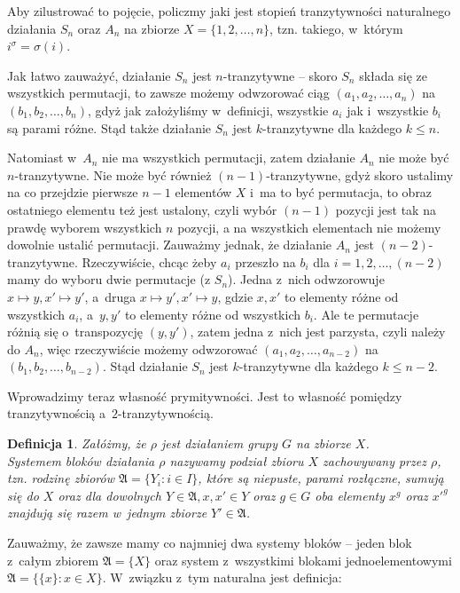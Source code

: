 \documentclass[licencjacka]{pracamgr}
\newtheorem{deff}{Definicja}[section]
\begin{document}
Aby zilustrować to pojęcie, policzmy jaki jest stopień tranzytywności naturalnego działania
$S_n$ oraz $A_n$ na zbiorze $X = \{1, 2, \ldots,
n\}$, tzn. takiego, w~którym $i^\sigma = \sigma(i)$.

Jak łatwo zauważyć, działanie $S_n$ jest $n$-tranzytywne -- skoro
$S_n$ składa się ze wszystkich permutacji, to zawsze możemy
odwzorować ciąg $(a_1, a_2, \ldots, a_n)$ na $(b_1, b_2, \ldots,
b_n)$, gdyż jak założyliśmy w~definicji, wszystkie $a_i$ jak
i~wszystkie $b_i$ są parami różne. Stąd także działanie $S_n$ jest
$k$-tranzytywne dla każdego $k \le n$.

Natomiast w~$A_n$ nie ma wszystkich permutacji, zatem działanie
$A_n$ nie może być $n$-tranzytywne. Nie może być również
$(n-1)$-tranzytywne, gdyż skoro ustalimy na co przejdzie pierwsze $n-1$
elementów $X$ i~ma to być permutacja, to obraz ostatniego elementu
też jest ustalony, czyli wybór $(n-1)$ pozycji jest tak na prawdę
wyborem wszystkich $n$ pozycji, a na wszystkich elementach nie
możemy dowolnie ustalić permutacji. Zauważmy jednak, że działanie
$A_n$ jest $(n-2)$-tranzytywne. Rzeczywiście, chcąc żeby $a_i$
przeszło na $b_i$ dla $i = 1, 2, \ldots, (n-2)$ mamy do wyboru dwie
permutacje (z $S_n$). Jedna z~nich odwzorowuje $x \mapsto y, x'
\mapsto y'$, a~druga $x \mapsto y', x' \mapsto y$, gdzie $x, x'$ to
elementy różne od wszystkich  $a_i$, a~$y, y'$ to elementy różne od wszystkich
$b_i$. Ale te permutacje różnią się o~transpozycję $(y, y')$, zatem
jedna z~nich jest parzysta, czyli należy do $A_n$, więc rzeczywiście
możemy odwzorować $(a_1, a_2, \ldots, a_{n-2})$ na $(b_1, b_2,
\ldots, b_{n-2})$. Stąd działanie $S_n$ jest $k$-tranzytywne dla
każdego $k \le n-2$.

Wprowadzimy teraz własność prymitywności. Jest to własność pomiędzy
tranzytywnością a~$2$-tranzytywnością.

\begin{deff}
    Załóżmy, że $\rho$ jest działaniem grupy $G$ na zbiorze $X$. \\
    \emph{Systemem bloków} działania $\rho$ nazywamy podział zbioru $X$ zachowywany przez $\rho$,
    tzn. rodzinę zbiorów $\mathfrak{A} = \{Y_i \colon i \in I \}$, które są niepuste, parami rozłączne, sumują się do $X$
    oraz dla dowolnych $Y \in \mathfrak{A}, x, x' \in Y$ oraz $g \in G$
    oba elementy $x^g$ oraz $x'^g$ znajdują się razem w~jednym zbiorze $Y' \in \mathfrak{A}$.
\end{deff}

Zauważmy, że zawsze mamy co najmniej dwa systemy bloków -- jeden
blok z~całym zbiorem $\mathfrak{A} = \{X\}$ oraz system z~wszystkimi
blokami jednoelementowymi $\mathfrak{A} = \{\{x\} \colon x \in X\}$.
W~związku z~tym naturalna jest definicja:
\end{document}
